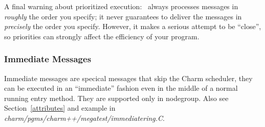 A final warning about prioritized execution: \charmpp\ always processes
messages in {\it roughly} the order you specify; it never guarantees to
deliver the messages in {\it precisely} the order you specify.
However, it makes a serious attempt to be ``close'', so priorities
can strongly affect the efficiency of your program.


\subsubsection{Immediate Messages}

Immediate messages are specical messages that skip the Charm scheduler, they
can be executed in an ``immediate'' fashion even in the middle of 
a normal running entry method. 
They are supported only in nodegroup.
Also see Section~\ref{attributes} and example in {\it charm/pgms/charm++/megatest/immediatering.C}.




